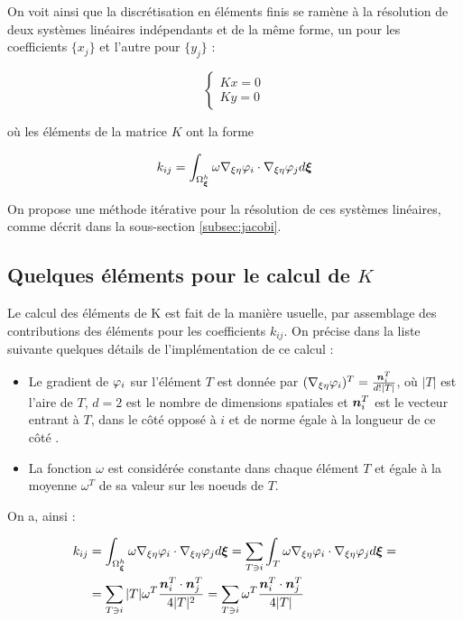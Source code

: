 \indent On voit ainsi que la discrétisation en éléments finis se ramène à la résolution de deux systèmes linéaires indépendants et de la même forme, un pour les coefficients \(\{x_j\}\) et l'autre pour \(\{y_j\}\) : 

\begin{equation}
	\label{eq:syst_final}
	\begin{cases}
		Kx = 0 \\
		Ky = 0
	\end{cases}
\end{equation}

\noindent où les éléments de la matrice \(K\) ont la forme

\begin{equation}
  k_{ij} = \int_{\Omega_{\boldsymbol{\xi}}^h}{ \omega \nabla_{\xi\eta} \varphi_i \cdot \nabla_{\xi\eta} \varphi_j  d\boldsymbol{\xi}}
\end{equation}

\indent On propose une méthode itérative pour la résolution de ces systèmes linéaires, comme décrit dans la sous-section \ref{subsec:jacobi}. 

\subsection{Quelques éléments pour le calcul de \(K\)}
\label{subsec:calculK}

\indent Le calcul des éléments de K est fait de la manière usuelle, par assemblage des contributions des éléments pour les coefficients \(k_{ij}\). On précise dans la liste suivante quelques détails de l'implémentation de ce calcul : 

\begin{itemize}
	\item Le gradient de \(\varphi_i\) sur l'élément \(T\) est donnée par \((\nabla_{\xi\eta} \varphi_i)^T = \frac{\boldsymbol{n}_i^T}{d\text{!}|T|}\), où \(|T|\) est l'aire de \(T\), \(d=2\) est le nombre de dimensions spatiales et \(\boldsymbol{n}_i^T\) est le vecteur entrant à \(T\), dans le côté opposé à \(i\) et de norme égale à la longueur de ce côté \cite{vecNormal}.
	\item La fonction \(\omega\) est considérée constante dans chaque élément \(T\) et égale à la moyenne \(\omega^T\) de sa valeur sur les noeuds de \(T\).
\end{itemize}

\indent On a, ainsi : 

\begin{equation}
\label{eq:calculK_2d}
\begin{gathered}
\begin{aligned}
	k_{ij} & = \int_{\Omega_{\boldsymbol{\xi}}^h}{ \omega \nabla_{\xi\eta} \varphi_i  \cdot \nabla_{\xi\eta} \varphi_j  d\boldsymbol{\xi}} = \sum_{T \ni i} {\int_{T}{ \omega \nabla_{\xi\eta} \varphi_i \cdot \nabla_{\xi\eta} \varphi_j  d\boldsymbol{\xi}}} = \\
	       &  = \sum_{T \ni i}
	              { 
	                     { |T|\omega^T \frac{\boldsymbol{n}_i^T\cdot \boldsymbol{n}_j^T}{4|T|^2}
	                     }
	              }
	          = \sum_{T \ni i}
	              { 
	                     { \omega^T \frac{\boldsymbol{n}_i^T\cdot \boldsymbol{n}_j^T}{4|T|}
	                     }
	              }	              
\end{aligned}
\end{gathered}
\end{equation}


